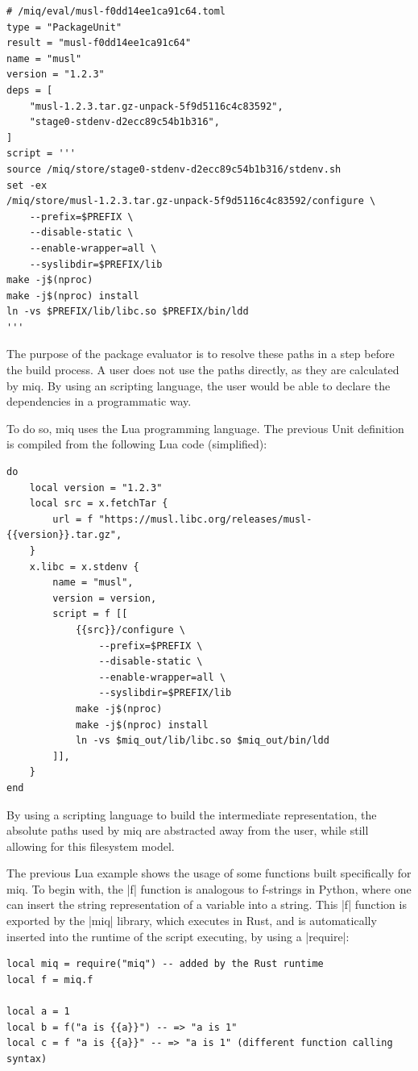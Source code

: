 \begin{verbatim}
# /miq/eval/musl-f0dd14ee1ca91c64.toml
type = "PackageUnit"
result = "musl-f0dd14ee1ca91c64"
name = "musl"
version = "1.2.3"
deps = [
    "musl-1.2.3.tar.gz-unpack-5f9d5116c4c83592",
    "stage0-stdenv-d2ecc89c54b1b316",
]
script = '''
source /miq/store/stage0-stdenv-d2ecc89c54b1b316/stdenv.sh
set -ex
/miq/store/musl-1.2.3.tar.gz-unpack-5f9d5116c4c83592/configure \
    --prefix=$PREFIX \
    --disable-static \
    --enable-wrapper=all \
    --syslibdir=$PREFIX/lib
make -j$(nproc)
make -j$(nproc) install
ln -vs $PREFIX/lib/libc.so $PREFIX/bin/ldd
'''
\end{verbatim}

The purpose of the package evaluator is to resolve these
paths in a step before the build process. A user does not
use the paths directly, as they are calculated by miq. By
using an scripting language, the user would be able to
declare the dependencies in a programmatic way.

To do so, miq uses the Lua programming language. The
previous Unit definition is compiled from the following Lua
code (simplified):

\begin{verbatim}
do
    local version = "1.2.3"
    local src = x.fetchTar {
        url = f "https://musl.libc.org/releases/musl-{{version}}.tar.gz",
    }
    x.libc = x.stdenv {
        name = "musl",
        version = version,
        script = f [[
            {{src}}/configure \
                --prefix=$PREFIX \
                --disable-static \
                --enable-wrapper=all \
                --syslibdir=$PREFIX/lib
            make -j$(nproc)
            make -j$(nproc) install
            ln -vs $miq_out/lib/libc.so $miq_out/bin/ldd
        ]],
    }
end
\end{verbatim}

By using a scripting language to build the intermediate
representation, the absolute paths used by miq are
abstracted away from the user, while still allowing for this
filesystem model.

The previous Lua example shows the usage of some functions
built specifically for miq. To begin with, the |f| function
is analogous to f-strings in Python, where one can insert
the string representation of a variable into a string. This
|f| function is exported by the |miq| library, which
executes in Rust, and is automatically inserted into the
runtime of the script executing, by using a |require|:

\begin{verbatim}
local miq = require("miq") -- added by the Rust runtime
local f = miq.f

local a = 1
local b = f("a is {{a}}") -- => "a is 1"
local c = f "a is {{a}}" -- => "a is 1" (different function calling syntax)
\end{verbatim}

